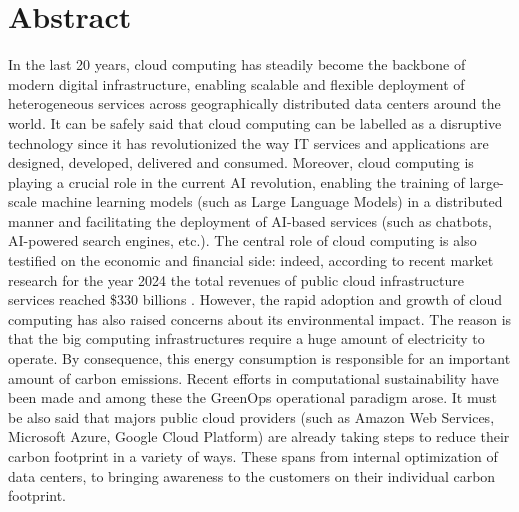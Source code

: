 \chapter*{Abstract} %
\label{abtract}





In the last 20 years, cloud computing has steadily become the backbone of modern digital infrastructure, enabling scalable and flexible deployment of heterogeneous services across geographically distributed data centers around the world.
It can be safely said that cloud computing can be labelled as a disruptive technology since it has revolutionized the way IT services and applications are designed, developed, delivered and consumed.
Moreover, cloud computing is playing a crucial role in the current AI revolution, enabling the training of large-scale machine learning models (such as Large Language Models) in a distributed manner and facilitating the deployment of AI-based services (such as chatbots, AI-powered search engines, etc.).
The central role of cloud computing is also testified on the economic and financial side: indeed, according to recent market research for the year 2024 the total revenues of public cloud infrastructure services reached \$330 billions \cite{statista_cloud_market_share}.
However, the rapid adoption and growth of cloud computing has also raised concerns about its environmental impact.
The reason is that the big computing infrastructures require a huge amount of electricity to operate.
By consequence, this energy consumption is responsible for an important amount of carbon emissions.
Recent efforts in computational sustainability have been made and among these the GreenOps operational paradigm arose.
It must be also said that majors public cloud providers (such as Amazon Web Services, Microsoft Azure, Google Cloud Platform) are already taking steps to reduce their carbon footprint in a variety of ways. 
These spans from internal optimization of data centers, to bringing awareness to the customers on their individual carbon footprint. \newline

